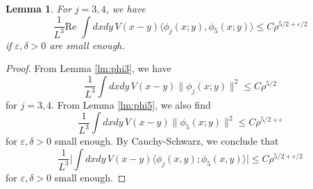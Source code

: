 \documentclass[a4paper,11pt]{article}
\def\eps{\varepsilon}
\newtheorem{lemma}[theorem]{Lemma}
\numberwithin{equation}{section}
\begin{document}
\begin{lemma}\label{lm:phi3phi5} For $j=3,4$, we have 
\[ \frac{1}{L^3} \text{Re } \int dx dy \, V(x-y) \langle \phi_j (x;y) , \phi_5 (x;y) \rangle \leq C \rho^{5/2+\eps/2} \]
if $\eps , \delta > 0$ are small enough. 
\end{lemma} 
\begin{proof} 
From Lemma \ref{lm:phi3}, we have 
\[ \frac{1}{L^3} \int dx dy \, V(x-y) \| \phi_j (x;y) \|^2 \leq C \rho^{5/2} \]
for $j=3,4$. From Lemma \ref{lm:phi5}, we also find 
\[ \frac{1}{L^3} \int dx dy \, V(x-y) \| \phi_5 (x;y) \|^2 \leq C \rho^{5/2+\eps} \]
for $\eps, \delta > 0$ small enough. By Cauchy-Schwarz, we conclude that 
\[ \frac{1}{L^3} \Big| \int dx dy \, V(x-y) \langle \phi_j (x,y) ; \phi_5 (x,y) \rangle \Big| \leq C \rho^{5/2+\eps/2}  \]
for $\eps , \delta > 0$ small enough. 
\end{proof} 
\end{document}
